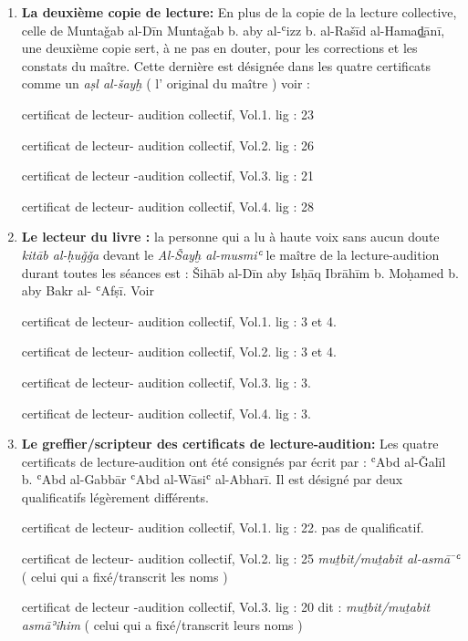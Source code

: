 \documentclass[a4paper,12pt]{report}
\begin{document}
\begin{itemize}
\begin{enumerate}
\begin{enumerate}
\item \textbf{La deuxième copie de lecture:}  En plus de la copie de   la lecture collective, celle de  Muntaǧab al-Dīn  Muntaǧab b. aby al-ʿizz b. al-Rašīd al-Hamaḏ̠ānī,
 une deuxième copie  sert, à ne pas en douter,  pour les corrections et les constats du maître.  Cette dernière est désignée dans les quatre certificats comme un  \textit{aṣl al-šayḫ} ( l' original du maître )  voir :
 
  certificat de  lecteur- audition collectif,  Vol.1. lig : 23
 
 certificat de  lecteur- audition collectif,  Vol.2. lig : 26

 certificat de  lecteur -audition collectif,  Vol.3. lig : 21

  	certificat de  lecteur- audition collectif,  Vol.4. lig : 28




\item \textbf{Le lecteur du livre :} la personne qui a lu  à haute voix sans aucun doute   \textit{ kitāb al-ḥuǧǧa } devant le \textit{Al-Šayḫ al-musmiʿ }  le maître de la lecture-audition  durant  toutes les séances est : 
Šihāb al-Dīn aby Isḥāq Ibrāhīm b. Moḥamed b. aby Bakr al- ʿAfṣī. Voir


 certificat de  lecteur- audition collectif,  Vol.1. lig : 3 et 4.

 certificat de  lecteur- audition collectif,  Vol.2. lig : 3 et 4.

 certificat de  lecteur- audition collectif,  Vol.3. lig : 3.

 certificat de  lecteur- audition collectif,  Vol.4. lig : 3.

\item \textbf{Le greffier/scripteur des certificats de lecture-audition:} Les quatre certificats de lecture-audition ont été consignés par écrit par :
ʿAbd al-Ǧalīl b. ʿAbd al-Gabbār ʿAbd al-Wāsiʿ al-Abharī. Il est désigné par deux qualificatifs   légèrement différents.


 certificat de  lecteur- audition collectif,  Vol.1. lig : 22. pas de qualificatif.

 certificat de  lecteur- audition collectif,  Vol.2. lig : 25 \textit{muṯbit/muṯabit al-asmā ̄ʿ} ( celui qui a fixé/transcrit les noms )

 certificat de  lecteur -audition collectif,  Vol.3. lig : 20 dit :  \textit{muṯbit/muṯabit asmāʾihim} ( celui qui a fixé/transcrit leurs noms )


\end{enumerate}
\end{enumerate}
\end{itemize}
\end{document}
